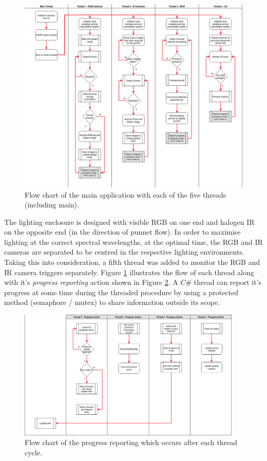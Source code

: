 \documentclass[fleqn,twoside,12pt]{report}
\begin{document}
\begin{figure}[ht]
	\centering
	\includegraphics[width=\textwidth]{software_flow_1.png}
	\caption{Flow chart of the main application with each of the five threads (including main).}
	\label{fig:software_flow_1}
\end{figure} 


The lighting enclosure is designed with visible RGB on one end and halogen IR on the opposite end (in the direction of punnet flow). In order to maximise lighting at the correct spectral wavelengths, at the optimal time, the RGB and IR cameras are separated to be centred in the respective lighting environments. Taking this into consideration, a fifth thread was added to monitor the RGB and IR camera triggers separately. Figure \ref{fig:software_flow_1} illustrates the flow of each thread along with it's \textit{progress reporting} action shown in Figure \ref{fig:software_flow_2}. A $C\#$ thread can report it's progress at some time during the threaded procedure by using a protected method (semaphore / mutex) to share information outside its scope. 

\begin{figure}[ht]
	\centering
	\includegraphics[width=0.95\textwidth]{software_flow_2.png}
	\caption{Flow chart of the progress reporting which occurs after each thread cycle.}
	\label{fig:software_flow_2}
\end{figure} 
\end{document}
